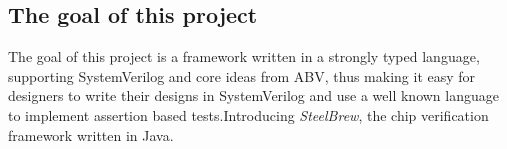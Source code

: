 \subsection{The goal of this project}
The goal of this project is a framework written in a strongly typed language, supporting SystemVerilog and core ideas from ABV, thus making it easy for designers to write their designs in SystemVerilog and use a well known language to implement assertion based tests.\newline Introducing \emph{SteelBrew}, the chip verification framework written in Java.